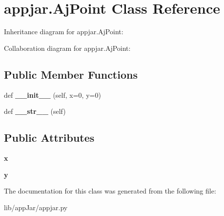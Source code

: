 \hypertarget{classappjar_1_1_aj_point}{}\section{appjar.\+Aj\+Point Class Reference}
\label{classappjar_1_1_aj_point}


Inheritance diagram for appjar.\+Aj\+Point\+:


Collaboration diagram for appjar.\+Aj\+Point\+:
\subsection*{Public Member Functions}
\begin{DoxyCompactItemize}
\item 
\mbox{\label{classappjar_1_1_aj_point_ae565ef5eb95ab346ed0e62794e656d62}} 
def {\bfseries \+\_\+\+\_\+init\+\_\+\+\_\+} (self, x=0, y=0)
\item 
\mbox{\label{classappjar_1_1_aj_point_a87ff8d14fe025724fedb0df39ec8763e}} 
def {\bfseries \+\_\+\+\_\+str\+\_\+\+\_\+} (self)
\end{DoxyCompactItemize}
\subsection*{Public Attributes}
\begin{DoxyCompactItemize}
\item 
\mbox{\label{classappjar_1_1_aj_point_a44e5d5db73c95f2db57208273b69029e}} 
{\bfseries x}
\item 
\mbox{\label{classappjar_1_1_aj_point_a4dd2d3df37d7987acd4e5e3692120846}} 
{\bfseries y}
\end{DoxyCompactItemize}


The documentation for this class was generated from the following file\+:\begin{DoxyCompactItemize}
\item 
lib/app\+Jar/appjar.\+py\end{DoxyCompactItemize}
